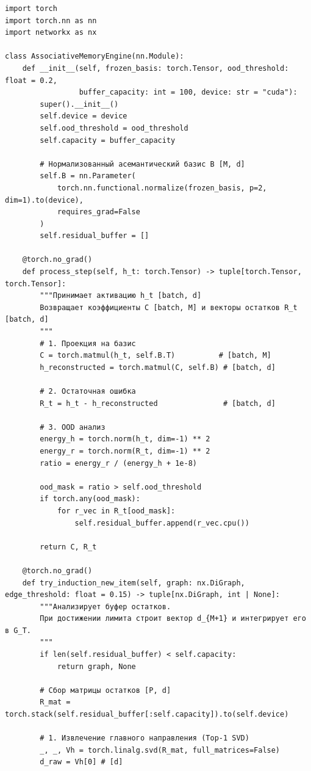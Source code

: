 \documentclass[11pt,a4paper]{article}
\begin{document}
\begin{lstlisting}
import torch
import torch.nn as nn
import networkx as nx

class AssociativeMemoryEngine(nn.Module):
    def __init__(self, frozen_basis: torch.Tensor, ood_threshold: float = 0.2, 
                 buffer_capacity: int = 100, device: str = "cuda"):
        super().__init__()
        self.device = device
        self.ood_threshold = ood_threshold
        self.capacity = buffer_capacity
        
        # Нормализованный асемантический базис B [M, d]
        self.B = nn.Parameter(
            torch.nn.functional.normalize(frozen_basis, p=2, dim=1).to(device),
            requires_grad=False
        )
        self.residual_buffer = []

    @torch.no_grad()
    def process_step(self, h_t: torch.Tensor) -> tuple[torch.Tensor, torch.Tensor]:
        """Принимает активацию h_t [batch, d]
        Возвращает коэффициенты C [batch, M] и векторы остатков R_t [batch, d]
        """
        # 1. Проекция на базис
        C = torch.matmul(h_t, self.B.T)          # [batch, M]
        h_reconstructed = torch.matmul(C, self.B) # [batch, d]
        
        # 2. Остаточная ошибка
        R_t = h_t - h_reconstructed               # [batch, d]
        
        # 3. OOD анализ
        energy_h = torch.norm(h_t, dim=-1) ** 2
        energy_r = torch.norm(R_t, dim=-1) ** 2
        ratio = energy_r / (energy_h + 1e-8)
        
        ood_mask = ratio > self.ood_threshold
        if torch.any(ood_mask):
            for r_vec in R_t[ood_mask]:
                self.residual_buffer.append(r_vec.cpu())
                
        return C, R_t

    @torch.no_grad()
    def try_induction_new_item(self, graph: nx.DiGraph, edge_threshold: float = 0.15) -> tuple[nx.DiGraph, int | None]:
        """Анализирует буфер остатков. 
        При достижении лимита строит вектор d_{M+1} и интегрирует его в G_T.
        """
        if len(self.residual_buffer) < self.capacity:
            return graph, None
            
        # Сбор матрицы остатков [P, d]
        R_mat = torch.stack(self.residual_buffer[:self.capacity]).to(self.device)
        
        # 1. Извлечение главного направления (Top-1 SVD)
        _, _, Vh = torch.linalg.svd(R_mat, full_matrices=False)
        d_raw = Vh[0] # [d]
        

\end{lstlisting}
\end{document}
